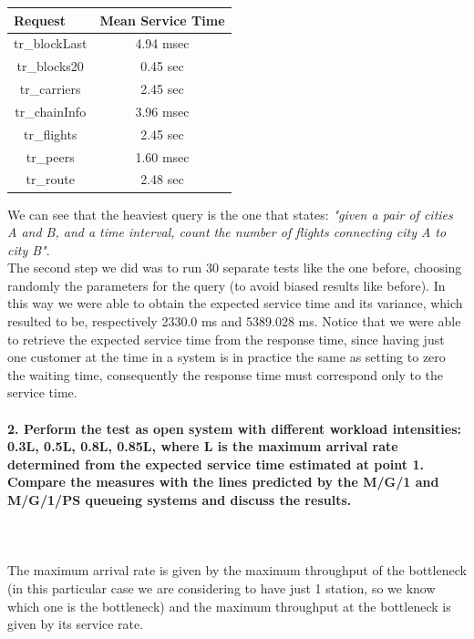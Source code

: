 \documentclass[11pt]{scrartcl} %
\begin{document}
\begin{table}[H]
\centering
\begin{tabular}{c|c}
\multicolumn{1}{l|}{Request} & \multicolumn{1}{l}{Mean Service Time} \\ \hline
tr\_blockLast & 4.94 msec \\
tr\_blocks20 & 0.45 sec \\
tr\_carriers & 2.45 sec \\
tr\_chainInfo & 3.96 msec \\
tr\_flights & 2.45 sec \\
tr\_peers & 1.60 msec \\
tr\_route & 2.48 sec \\
\end{tabular}
\end{table}

We can see that the heaviest query is the one that states: \textit{"given a pair of cities A and B, and a time interval, count the number of flights connecting city A to city B"}.\\

The second step we did was to run 30 separate tests like the one before, choosing randomly the parameters for the query (to avoid biased results like before). In this way we were able to obtain the expected service time and its variance, which resulted to be, respectively 2330.0 ms and 5389.028 ms.
Notice that we were able to retrieve the expected service time from the response time, since having just one customer at the time in a system is in practice the same as setting to zero the waiting time, consequently the response time must correspond only to the service time.

\paragraph*{2. Perform the test as open system with different workload intensities: 0.3L, 0.5L, 0.8L, 0.85L, where L is the maximum arrival rate determined from the expected service time estimated at point 1. Compare the measures with the lines predicted by the M/G/1 and M/G/1/PS queueing systems and discuss the results.} \mbox{}\\\\

The maximum arrival rate is given by the maximum throughput of the bottleneck (in this particular case we are considering to have just 1 station, so we know which one is the bottleneck) and the maximum throughput at the bottleneck is given by its service rate.
\end{document}
